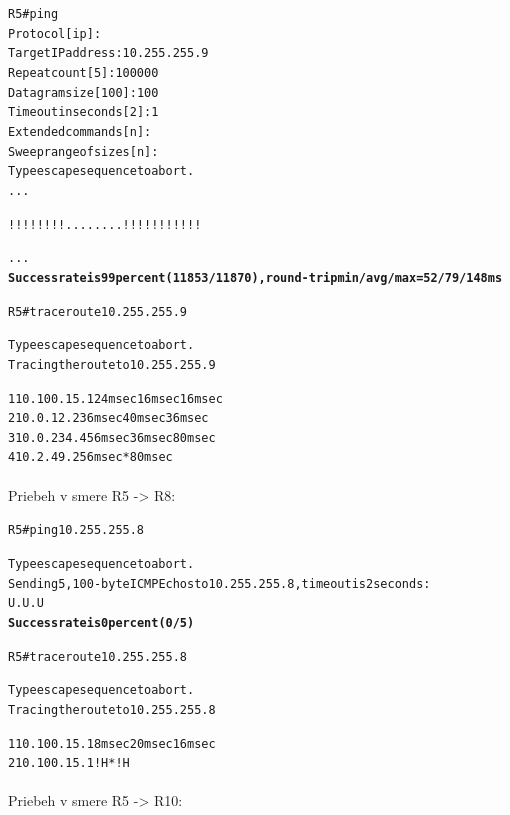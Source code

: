 \documentclass[12pt,twoside,a4paper]{report}
\begin{document}
\noindent
{\selectfont
\begin{small}
\begin{alltt}

R5#ping
Protocol [ip]:
Target IP address: 10.255.255.9
Repeat count [5]: 100000
Datagram size [100]: 100
Timeout in seconds [2]: 1
Extended commands [n]:
Sweep range of sizes [n]:
Type escape sequence to abort.
...

!!!!!!!!........!!!!!!!!!!!

...
\textbf{Success rate is 99 percent (11853/11870), round-trip min/avg/max = 52/79/148 ms}




R5#traceroute 10.255.255.9

Type escape sequence to abort.
Tracing the route to 10.255.255.9

  1 10.100.15.1 24 msec 16 msec 16 msec
  2 10.0.12.2 36 msec 40 msec 36 msec
  3 10.0.234.4 56 msec 36 msec 80 msec
  4 10.2.49.2 56 msec *  80 msec

\end{alltt}
\end{small}
}



\paragraph{}
Priebeh  v smere R5 -\textgreater{} R8:

\noindent
{\selectfont
\begin{small}
\begin{alltt}

R5#ping 10.255.255.8

Type escape sequence to abort.
Sending 5, 100-byte ICMP Echos to 10.255.255.8, timeout is 2 seconds:
U.U.U
\textbf{Success rate is 0 percent (0/5)}




R5#traceroute 10.255.255.8

Type escape sequence to abort.
Tracing the route to 10.255.255.8

  1 10.100.15.1 8 msec 20 msec 16 msec
  2 10.100.15.1 !H  *  !H

\end{alltt}
\end{small}
}


\paragraph{}
Priebeh  v smere R5 -\textgreater{} R10:
\end{document}
